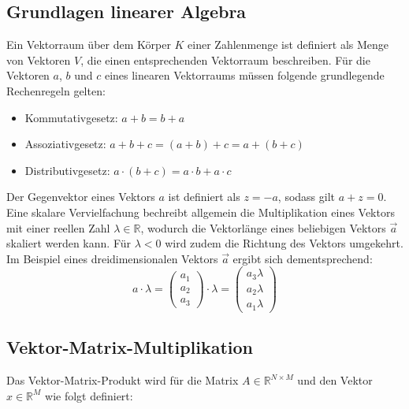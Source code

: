 \documentclass[]{dsadokumentation}
\begin{document}
\subsection{Grundlagen linearer Algebra}
Ein Vektorraum über dem Körper $K$ einer Zahlenmenge ist definiert als Menge von Vektoren $V$, die einen entsprechenden Vektorraum beschreiben. Für die Vektoren $a$, $b$ und $c$ eines linearen Vektorraums müssen folgende grundlegende Rechenregeln gelten:
\begin{itemize}
\item Kommutativgesetz: $a + b = b + a$
\item Assoziativgesetz: $a + b + c = (a + b) + c = a + (b + c)$
\item Distributivgesetz: $a \cdot (b + c) = a \cdot b + a \cdot c$
\end{itemize}

Der Gegenvektor eines Vektors $a$ ist definiert als $z = -a$, sodass gilt $a + z = 0$. Eine skalare Vervielfachung bechreibt allgemein die Multiplikation eines Vektors mit einer reellen Zahl $\lambda \in \mathbb{R}$, wodurch die Vektorlänge eines beliebigen Vektors $\vec{a}$ skaliert werden kann. Für $\lambda < 0$ wird zudem die Richtung des Vektors umgekehrt. Im Beispiel eines dreidimensionalen Vektors $\vec{a}$ ergibt sich dementsprechend:
\[ a \cdot \lambda = \left(\begin{array}{c} a_1 \\ a_2 \\ a_3 \end{array}\right)\cdot \lambda=\left(\begin{array}{c} a_3 \lambda \\ a_2 \lambda \\ a_1 \lambda \end{array}\right) \]


\subsection{Vektor-Matrix-Multiplikation}

Das Vektor-Matrix-Produkt wird für die Matrix $A \in \mathbb{R}^{N \times M}$ und den Vektor $x \in \mathbb{R}^M$ wie folgt definiert:
\end{document}
